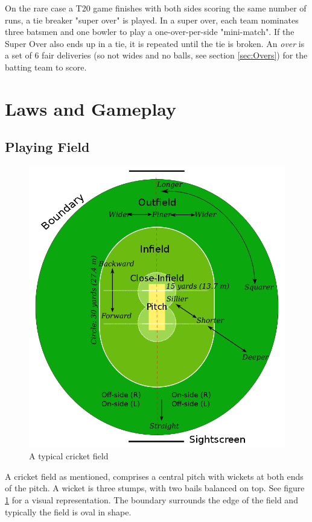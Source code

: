 \documentclass[12pt,a4paper]{report}
\theoremstyle{definition}
\begin{document}
On the rare case a T20 game finishes with both sides scoring the same number of runs, a tie breaker "super over" is played.
In a super over, each team nominates three batsmen and one bowler to play a one-over-per-side "mini-match".
If the Super Over also ends up in a tie, it is repeated until the tie is broken.
An \emph{over} is a set of 6 fair deliveries (so not wides and no balls, see section \ref{sec:Overs}) for the batting team to score.

\section{Laws and Gameplay}

\subsection{Playing Field}

\begin{figure}[H]
    \centering
    \includegraphics[width=0.8\linewidth]{Cricket_Field.png}
    \caption{A typical cricket field \citep{cricketWiki}}
    \label{fig:CricketField}
\end{figure}

A cricket field as mentioned, comprises a central pitch with wickets at both ends of the pitch. 
A wicket is three stumps, with two bails balanced on top. 
See figure \ref{fig:CricketField} for a visual representation.
The boundary surrounds the edge of the field and typically the field is oval in shape.
\end{document}
